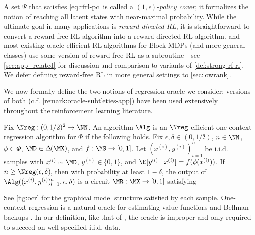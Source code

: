 A set $\Psi$ that satisfies \cref{eq:rfrl-pc} is called a $(1,\epsilon)$-\emph{policy cover}; it formalizes the notion of reaching all latent states with near-maximal probability. While the ultimate goal in many applications is \emph{reward-directed RL}, it is straightforward to convert a reward-free RL algorithm into a reward-directed RL algorithm, and most existing oracle-efficient RL algorithms for Block MDPs (and more general classes) use some version of reward-free RL as a subroutine---see \cref{sec:app_related} for discussion and comparison to variants of \cref{def:strong-rf-rl}. We defer defining reward-free RL in more general settings to \cref{sec:lowrank}.\loose %


We now formally define the two notions of regression oracle we consider; versions of both (c.f. \cref{remark:oracle-subtleties-app}) have been used extensively throughout the reinforcement learning literature.

\begin{definition}\label{def:one-con-regression}
Fix $\Nreg: (0,1/2)^2 \to \NN$. An algorithm $\Alg$ is an $\Nreg$-efficient one-context regression algorithm for $\Phi$ if the following holds. Fix $\epsilon,\delta \in (0,1/2)$, $n \in \NN$, $\phi \in \Phi$, $\MD \in \Delta(\MX)$, and $f: \MS \to [0,1]$. Let $(x^{(i)},y^{(i)})_{i=1}^n$ be i.i.d. samples with $x^{(i)} \sim \MD$, $y^{(i)} \in \{0,1\}$, and $\E[y^{(i)}\mid{}x^{(i)}] = f(\phi(x^{(i)}))$. If $n \geq \Nreg(\epsilon,\delta)$, then with probability at least $1-\delta$, the output of $\Alg((x^{(i)},y^{(i)})_{i=1}^n, \epsilon,\delta)$ is a circuit $\MR: \MX \to [0,1]$ satisfying 
\end{definition}

See \cref{fig:ocr} for the graphical model structure satisfied by each sample. One-context regression is a natural oracle for estimating value functions and Bellman backups \citep{ernst2005tree,mhammedi2023efficient,golowich2024exploration}. In our definition, like that of \cite{golowich2024exploration}, the oracle is improper and only required to succeed on well-specified i.i.d. data.

